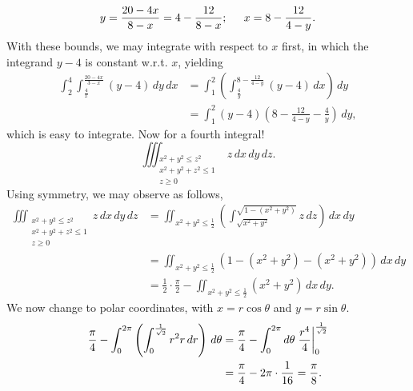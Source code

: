 \[ y = \frac{20 - 4x}{8 - x} = 4 - \frac{12}{8-x}; \hspace{0.2in} x = 8 - \frac{12}{4 - y}. \]
With these bounds, we may integrate with respect to $x$ first, in which the integrand $y - 4$ is constant w.r.t. $x$, yielding
\begin{align*}
    \int_2^4 \int_{\frac{4}{x}}^{\frac{20 - 4x}{3 - x}} (y - 4) \, dy \, dx &= \int_1^2 \left(\int_{\frac{4}{y}}^{8 - \frac{12}{4 - y}} (y - 4) \, dx \right) \, dy \\
    &= \int_1^2 (y - 4)\left(8 - \frac{12}{4 - y} - \frac{4}{y}\right) \, dy,
\end{align*}
which is easy to integrate. Now for a fourth integral!
\[ \iiint_{\substack{x^2 + y^2 \leq z^2 \\ x^2 + y^2 + z^2 \leq 1 \\ z \geq 0}} z \, dx \, dy \, dz. \]
Using symmetry, we may observe as follows,
\begin{align*}
    \iiint_{\substack{x^2 + y^2 \leq z^2 \\ x^2 + y^2 + z^2 \leq 1 \\ z \geq 0}} z \, dx \, dy \, dz &= \iint_{x^2 + y^2 \leq \frac{1}{2}} \left( \int_{\sqrt{x^2 + y^2}}^{\sqrt{1 - (x^2 + y^2)}} z \, dz \right) \, dx \, dy \\
    &= \iint_{x^2 + y^2 \leq \frac{1}{2}} \left(1 - (x^2 + y^2) - (x^2 + y^2) \right) \, dx \, dy \\
    &= \frac{1}{2} \cdot \frac{\pi}{2} - \iint_{x^2 + y^2 \leq \frac{1}{2}} (x^2 + y^2) \, dx \, dy.
\end{align*}
We now change to polar coordinates, with $x = r \cos \theta$ and $y = r \sin \theta$.
\begin{align*}
    \frac{\pi}{4} - \int_0^{2\pi} \left( \int_0^{\frac{1}{\sqrt{2}}} r^2 r \, dr \right) \, d\theta &= \frac{\pi}{4} - \int_0^{2\pi} d \theta \left.\frac{r^4}{4}\right\rvert_{0}^{\frac{1}{\sqrt{2}}} \\
    &= \frac{\pi}{4} - 2 \pi \cdot \frac{1}{16} = \frac{\pi}{8}.
\end{align*}